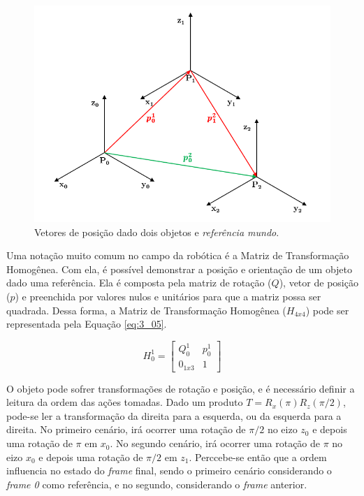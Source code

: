 \begin{figure}[h!]
\centering
\includegraphics[width=0.7\columnwidth]{Imagens/DoisPontos.PNG}
\caption{Vetores de posição dado dois objetos e \textit{referência mundo}.}
\label{fig:DoisPontos}
\end{figure}


Uma notação muito comum no campo da robótica é a Matriz de Transformação Homogênea. Com ela, é possível demonstrar a posição e orientação de um objeto dado uma referência. Ela é composta pela matriz de rotação ($Q$), vetor de posição ($p$) e preenchida por valores nulos e unitários para que a matriz possa ser quadrada. Dessa forma, a Matriz de Transformação Homogênea ($H_{4x4}$) pode ser representada pela Equação \ref{eq:3_05}.

\begin{equation}
H_0^1 = 
\begin{bmatrix}
Q_0^1 & p_0^1 \\
0_{1x3} & 1
\end{bmatrix} 
\label{eq:3_05}
\end{equation}

O objeto pode sofrer transformações de rotação e posição, e é necessário definir a leitura da ordem das ações tomadas. Dado um produto $T = R_x(\pi)R_z(\pi/2)$, pode-se ler a transformação da direita para a esquerda, ou da esquerda para a direita. No primeiro cenário, irá ocorrer uma rotação de $\pi/2$ no eizo $z_0$ e depois uma rotação de $\pi$ em $x_0$. No segundo cenário, irá ocorrer uma rotação de $\pi$ no eizo $x_0$ e depois uma rotação de $\pi/2$ em $z_1$. Perccebe-se então que a ordem influencia no estado do \textit{frame} final, sendo o primeiro cenário considerando o \textit{frame 0} como referência, e no segundo, considerando o \textit{frame} anterior.

